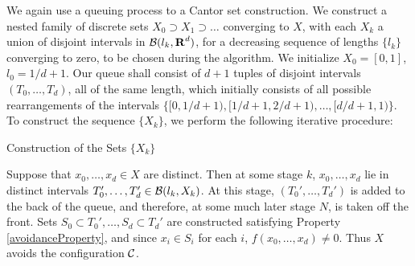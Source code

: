 We again use a queuing process to a Cantor set construction. We construct a nested family of discrete sets $X_0 \supset X_1 \supset \dots$ converging to $X$, with each $X_k$ a union of disjoint intervals in $\operatorname{\mathcal{B}}(l_k,\operatorname{\mathbf{R}}^d)$, for a decreasing sequence of lengths $\{ l_k \}$ converging to zero, to be chosen during the algorithm. We initialize $X_0 = [0,1]$, $l_0 = 1/d+1$. Our queue shall consist of $d+1$ tuples of disjoint intervals $(T_0, \dots, T_d)$, all of the same length, which initially consists of all possible rearrangements of the intervals $\{ [0,1/d+1), [1/d+1,2/d+1), \dots, [d/d+1, 1) \}$. To construct the sequence $\{ X_k \}$, we perform the following iterative procedure:
%
\begin{algorithm}[H]
    \begin{algorithmic}
        \caption{Construction of the Sets $\{ X_k \}$}
        \MRepeat
        \EndRepeat   
    \end{algorithmic}
\end{algorithm}

Suppose that $x_0, \dots, x_d \in X$ are distinct. Then at some stage $k$, $x_0, \dots, x_d$ lie in distinct intervals $T_0', \dots, T_d' \in \operatorname{\mathcal{B}}(l_k,X_k)$. At this stage, $(T_0', \dots, T_d')$ is added to the back of the queue, and therefore, at some much later stage $N$, is taken off the front. Sets $S_0 \subset T_0', \dots, S_d \subset T_d'$ are constructed satisfying Property \ref{avoidanceProperty}, and since $x_i \in S_i$ for each $i$, $f(x_0, \dots, x_d) \neq 0$. Thus $X$ avoids the configuration $\operatorname{\mathcal{C}}$.

